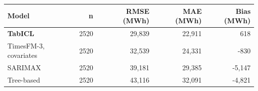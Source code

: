 \begin{tabular}{lrrrr}
\toprule
Model & n & RMSE (MWh) & MAE (MWh) & Bias (MWh) \\
\midrule
\textbf{TabICL} & 2520 & 29,839 & 22,911 & 618 \\
TimesFM-3, covariates & 2520 & 32,539 & 24,331 & -830 \\
SARIMAX & 2520 & 39,181 & 29,385 & -5,147 \\
Tree-based & 2520 & 43,116 & 32,091 & -4,821 \\
\bottomrule
\end{tabular}
